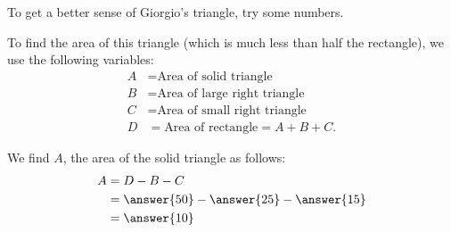 \documentclass[nooutcomes,space]{ximera}
\begin{document}
\begin{problem}
\begin{problem}
To get a better sense of Giorgio's triangle, try some numbers.  
\begin{image}
\end{image}
To find the area of this triangle (which is much less than half the rectangle), we use the following variables:   
\begin{align*}
A &= \textrm{Area of solid triangle} \\
B &= \textrm{Area of large right triangle} \\
C &= \textrm{Area of small right triangle} \\
D &= \textrm{Area of rectangle} = A + B + C.
\end{align*}

We find $A$, the area of the solid triangle as follows:  
\begin{align*}
A  &= D - B  - C \\
      &= \answer{50} - \answer{25} - \answer{15} \\
      &= \answer{10}
\end{align*}




\end{problem}
\end{problem}
\end{document}
